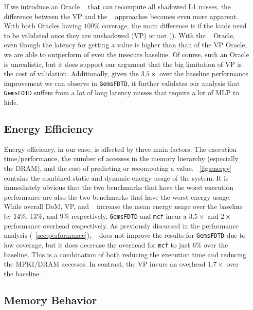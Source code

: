 If we introduce an Oracle \recomp~ that can recompute all shadowed L1 misses, the difference between the VP and the \recomp~ approaches becomes even more apparent. With both Oracles having $100\%$ coverage, the main difference is if the loads need to be validated once they are unshadowed (VP) or not (\recomp). 
With the \recomp~ Oracle, even though the latency for getting a value is higher than than of the VP Oracle, we are able to outperform of even the insecure baseline. Of course, such an Oracle is unrealistic, but it does support our argument that the big limitation of VP is the cost of validation. Additionally, given the $3.5\times$ over the baseline performance improvement we can observe in \texttt{GemsFDTD}, it further validates our analysis that \texttt{GemsFDTD} suffers from a lot of long latency misses that require a lot of MLP to hide.

\subsection{Energy Efficiency}
\label{sec:energy}

Energy efficiency, in our case, is affected by three main factors: The execution time/performance, the number of accesses in the memory hierarchy (especially the DRAM), and the cost of predicting or recomputing a value.
~\autoref{fig:energy} contains the combined static and dynamic energy usage of the system. It is immediately obvious that the two benchmarks that have the worst execution performance are also the two benchmarks that have the worst energy usage. While overall DoM, VP, and \recomp~ increase the mean energy usage over the baseline by $14\%$, $13\%$, and $9\%$ respectively, \texttt{GemsFDTD} and \texttt{mcf} incur a $3.5\times$ and $2\times$ performance overhead respectively. As previously discussed in the performance analysis (~\autoref{sec:performance}), \recomp~ does not improve the results for \texttt{GemsFDTD} due to low coverage, but it does decrease the overhead for \texttt{mcf} to just $6\%$ over the baseline. This is a combination of both reducing the execution time and reducing the MPKI/DRAM accesses. In contrast, the VP incurs an overhead $1.7\times$ over the baseline.

\subsection{Memory Behavior}
\label{sec:memory}